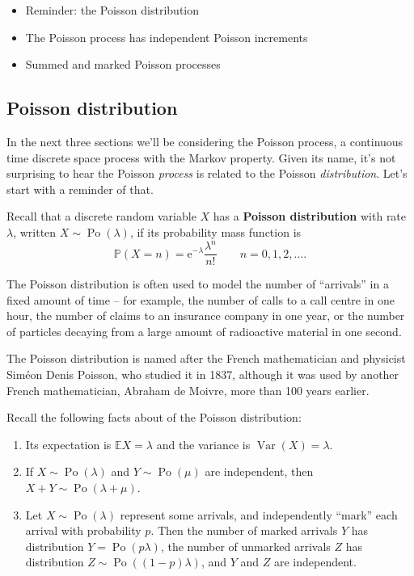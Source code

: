 \documentclass[
  a4paper,
]{article}
\providecommand{\tightlist}{%
  \setlength{\itemsep}{0pt}\setlength{\parskip}{0pt}}
\theoremstyle{definition}
\theoremstyle{definition}
\theoremstyle{definition}
\theoremstyle{remark}
\begin{document}
\begin{itemize}
\tightlist
\item
  Reminder: the Poisson distribution
\item
  The Poisson process has independent Poisson increments
\item
  Summed and marked Poisson processes
\end{itemize}

\newcommand{\Po}{\operatorname{Po}}
\newcommand{\ee}{\mathrm{e}}

\hypertarget{poisson-dist}{%
\subsection{Poisson distribution}\label{poisson-dist}}

In the next three sections we'll be considering the Poisson process, a continuous time discrete space process with the Markov property. Given its name, it's not surprising to hear the Poisson \emph{process} is related to the Poisson \emph{distribution}. Let's start with a reminder of that.

Recall that a discrete random variable \(X\) has a \textbf{Poisson distribution} with rate \(\lambda\), written \(X \sim \operatorname{Po}(\lambda)\), if its probability mass function is
\[ \mathbb P(X = n) = \mathrm{e}^{-\lambda} \frac{\lambda^n}{n!} \qquad n = 0,1,2,\dots. \]

The Poisson distribution is often used to model the number of ``arrivals'' in a fixed amount of time -- for example, the number of calls to a call centre in one hour, the number of claims to an insurance company in one year, or the number of particles decaying from a large amount of radioactive material in one second.

The Poisson distribution is named after the French mathematician and physicist Siméon Denis Poisson, who studied it in 1837, although it was used by another French mathematician, Abraham de Moivre, more than 100 years earlier.

Recall the following facts about of the Poisson distribution:

\begin{enumerate}
\def\labelenumi{\arabic{enumi}.}
\tightlist
\item
  Its expectation is \(\mathbb EX = \lambda\) and the variance is \(\operatorname{Var}(X) = \lambda\).
\item
  If \(X \sim \operatorname{Po}(\lambda)\) and \(Y \sim \operatorname{Po}(\mu)\) are independent, then \(X + Y \sim \operatorname{Po}(\lambda+\mu)\).
\item
  Let \(X \sim \operatorname{Po}(\lambda)\) represent some arrivals, and independently ``mark'' each arrival with probability \(p\). Then the number of marked arrivals \(Y\) has distribution \(Y = \operatorname{Po}(p\lambda)\), the number of unmarked arrivals \(Z\) has distribution \(Z \sim \operatorname{Po}((1-p)\lambda)\), and \(Y\) and \(Z\) are independent.
\end{enumerate}
\end{document}
